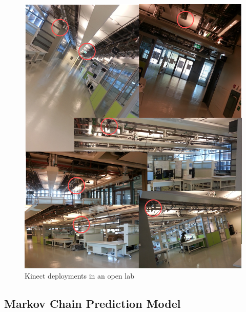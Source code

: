 \documentclass{sig-alternate}
\begin{document}
\begin{figure}[!tb]
  \centering
  \includegraphics[scale=0.3]{realworld}
  \caption{Kinect deployments in an open lab}
  \label{fig:kinect-deployment}
\end{figure}



\subsection{Markov Chain Prediction Model}
\label{sec:mark-chain-pred}
\end{document}
